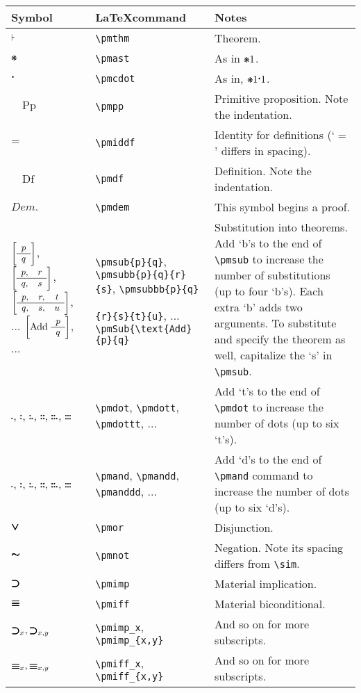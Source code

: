 \documentclass[12pt]{article}
\newcommand{\pmdem}{\textit{Dem}.} %
\newcommand{\pmsub}[2]{\bigg \lbrack \small \begin{array}{c} #1 \\ \hline #2 \end{array} \bigg \rbrack} %
\newcommand{\pmsubb}[4]{\bigg \lbrack \small \begin{array}{c c} #1, & #3 \\ \hline #2, & #4 \end{array}  \bigg \rbrack} %
\newcommand{\pmsubbb}[6]{\bigg \lbrack \small \begin{array}{c c c} #1, & #3, & #5 \\ \hline #2, & #4, & #6 \end{array}  \bigg \rbrack} %
\newcommand{\pmSub}[3]{\bigg \lbrack \normalsize #1 \text{ } \small \begin{array}{c} #2 \\ \hline #3 \end{array}  \bigg \rbrack} %
\newcommand{\pmthm}{\mathpunct{\text{\scalebox{.5}[1]{$\boldsymbol\vdash$}}}} %
\newcommand{\pmast}{\text{\resizebox{!}{.75\height}{\ding{107}}}} %
\newcommand{\pmcdot}{\text{\raisebox{.05cm}{$\boldsymbol\cdot$}}} %
\newcommand{\pmiddf}{\mathbin{=}}
\newcommand{\pmdf}{\quad \text{Df}}
\newcommand{\pmpp}{\quad \text{Pp}}
\newcommand{\pmdot}{\mathrel{\hbox{\rule{.3ex}{.3ex}}}}
\newcommand{\pmdott}{\mathrel{\overset{\pmdot}{\pmdot}}}
\newcommand{\pmdottt}{\pmdott\hspace{.1em}\pmdot}
\newcommand{\pmdotttt}{\pmdott\hspace{.1em}\pmdott}
\newcommand{\pmdottttt}{\pmdott\hspace{.1em}\pmdott\hspace{.1em}\pmdot}
\newcommand{\pmdotttttt}{\pmdott\hspace{.1em}\pmdott\hspace{.1em}\pmdott}
\newcommand{\pmnot}{\mathord{\ooalign{$\boldsymbol{\sim}\mkern.5mu$\hidewidth\cr$\boldsymbol{\sim}$\cr\hidewidth$\mkern.5mu\boldsymbol{\sim}$}}}
\newcommand{\pmor}{\mathbin{\ooalign{$\boldsymbol{\vee}\mkern.5mu$\hidewidth\cr$\boldsymbol{\vee}$\cr\hidewidth$\mkern.5mu\boldsymbol{\vee}$}}}
\newcommand{\pmimp}{\mathbin{\ooalign{$\boldsymbol{\supset}\mkern.5mu$\hidewidth\cr$\boldsymbol{\supset}$\cr\hidewidth$\mkern.5mu\boldsymbol{\supset}$}}} %
\newcommand{\pmand}{\mathrel{\hbox{\rule{.3ex}{.3ex}}}} %
\newcommand{\pmandd}{\overset{\pmand}{\pmand}}
\newcommand{\pmanddd}{\pmandd\hspace{.1em}\pmand}
\newcommand{\pmandddd}{\pmandd\hspace{.1em}\pmandd}
\newcommand{\pmanddddd}{\pmandd\hspace{.1em}\pmandd\hspace{.1em}\pmand}
\newcommand{\pmandddddd}{\pmandd\hspace{.1em}\pmandd\hspace{.1em}\pmandd}
\newcommand{\pmiff}{\mathbin{\ooalign{$\boldsymbol{\equiv}\mkern.5mu$\hidewidth\cr$\boldsymbol{\equiv}$\cr\hidewidth$\mkern.5mu\boldsymbol{\equiv}$}}} %
\begin{document}
\noindent \begin{tabular}{@{}p{3cm} | p{5cm} | p{8.25cm}}
	\textbf{Symbol} & \textbf{\LaTeX command} & \textbf{Notes} \\ \hline
	$\pmthm$ & \verb|\pmthm| & Theorem. \\
	$\pmast$ & \verb|\pmast| & As in $\pmast1$.  \\ 
	$\pmcdot$ & \verb|\pmcdot| & As in, $\pmast1\pmcdot1$. \\
	$\pmpp$ & \verb|\pmpp| & Primitive proposition. Note the indentation. \\
	$\pmiddf$ & \verb|\pmiddf| & Identity for definitions (`$=$' differs in spacing).  \\
	$\pmdf$ & \verb|\pmdf| & Definition. Note the indentation.  \\
	$\pmdem$ & \verb|\pmdem| & This symbol begins a proof. \\  
	$\pmsub{p}{q}$, $\pmsubb{p}{q}{r}{s}$, $\pmsubbb{p}{q}{r}{s}{t}{u}$, ... $\pmSub{\text{Add}}{p}{q}$, ... & \verb|\pmsub{p}{q}|, \verb|\pmsubb{p}{q}{r}{s}|, \verb|\pmsubbb{p}{q}| \par \hfill \verb|{r}{s}{t}{u}|, ... \verb|\pmSub{\text{Add}{p}{q}| & Substitution into theorems. Add `b's to the end of \verb|\pmsub| to increase the number of substitutions (up to four `b's). Each extra `b' adds two arguments. To substitute and specify the theorem as well, capitalize the `s' in \verb|\pmsub|. \\
	$\pmdot$, $\pmdott$, $\pmdottt$, $\pmdotttt$, $\pmdottttt$, $\pmdotttttt$ & \verb|\pmdot|, \verb|\pmdott|, \verb|\pmdottt|, ... & Add `t's to the end of \verb|\pmdot| to increase the number of dots (up to six `t's). \\ 
	$\pmand$, $\pmandd$, $\pmanddd$, $\pmandddd$, $\pmanddddd$, $\pmandddddd$ & \verb|\pmand|, \verb|\pmandd|, \verb|\pmanddd|, ...& Add `d's to the end of \verb|\pmand| command to increase the number of dots (up to six `d's). \\ 
	$\pmor$ & \verb|\pmor| & Disjunction. \\
	$\pmnot$ & \verb|\pmnot| & Negation. Note its spacing differs from \verb|\sim|. \\
	$\pmimp$ & \verb|\pmimp| & Material implication. \\
	$\pmiff$ & \verb|\pmiff| & Material biconditional. \\
	$\pmimp_x, \pmimp_{x,y}$ & \verb|\pmimp_x|, \verb|\pmimp_{x,y}| & And so on for more subscripts. \\
	$\pmiff_x, \pmiff_{x,y}$ & \verb|\pmiff_x|, \verb|\pmiff_{x,y}| & And so on for more subscripts. \\

\end{tabular}
\end{document}
